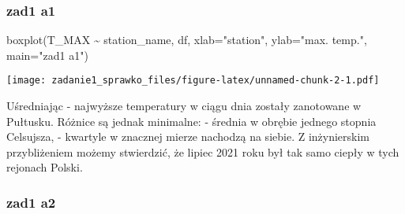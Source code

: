 \documentclass[
]{article}
\newenvironment{Shaded}{\begin{snugshade}}{\end{snugshade}}
\newcommand{\AttributeTok}[1]{\textcolor[rgb]{0.77,0.63,0.00}{#1}}
\newcommand{\FunctionTok}[1]{\textcolor[rgb]{0.00,0.00,0.00}{#1}}
\newcommand{\NormalTok}[1]{#1}
\newcommand{\OtherTok}[1]{\textcolor[rgb]{0.56,0.35,0.01}{#1}}
\newcommand{\SpecialCharTok}[1]{\textcolor[rgb]{0.00,0.00,0.00}{#1}}
\newcommand{\StringTok}[1]{\textcolor[rgb]{0.31,0.60,0.02}{#1}}
\begin{document}
\begin{Shaded}
\end{Shaded}

\hypertarget{zad1-a1}{%
\subsubsection{zad1 a1}\label{zad1-a1}}

\begin{Shaded}
\begin{Highlighting}[]
\FunctionTok{boxplot}\NormalTok{(T\_MAX }\SpecialCharTok{\textasciitilde{}}\NormalTok{ station\_name, df, }\AttributeTok{xlab=}\StringTok{"station"}\NormalTok{, }\AttributeTok{ylab=}\StringTok{"max. temp."}\NormalTok{, }\AttributeTok{main=}\StringTok{"zad1 a1"}\NormalTok{)}
\end{Highlighting}
\end{Shaded}

\texttt{[image: zadanie1\_sprawko\_files/figure-latex/unnamed-chunk-2-1.pdf]}

Uśredniając - najwyższe temperatury w ciągu dnia zostały zanotowane w
Pułtusku. Różnice są jednak minimalne: - średnia w obrębie jednego
stopnia Celsujsza, - kwartyle w znacznej mierze nachodzą na siebie. Z
inżynierskim przybliżeniem możemy stwierdzić, że lipiec 2021 roku był
tak samo ciepły w tych rejonach Polski.

\hypertarget{zad1-a2}{%
\subsubsection{zad1 a2}\label{zad1-a2}}
\end{document}
